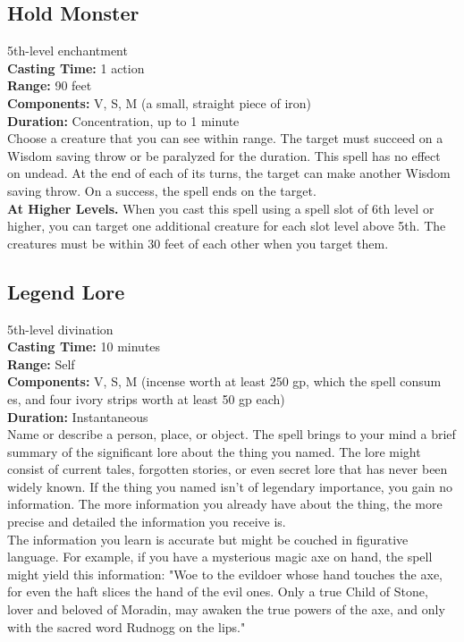 \documentclass[11pt, A4paper, english]{article}
\begin{document}
		\subsection{Hold Monster}
5th-level enchantment \\
\textbf{Casting Time:} 1 action \\
\textbf{Range:} 90 feet \\
\textbf{Components:} V, S, M (a small, straight piece of iron) \\
\textbf{Duration:} Concentration, up to 1 minute \\
Choose a creature that you can see within range. The target must succeed on a Wisdom saving throw or be paralyzed for the duration. This spell has no effect on undead. At the end of each of its turns, the target can make another Wisdom  saving throw. On a success, the spell ends on the target. \\
\textbf{At Higher Levels.} When you cast this spell using a spell slot of 6th level or higher, you can target one additional creature for each slot level above 5th. The creatures must be within 30 feet of each other when you target them.

		\subsection{Legend Lore}
5th-level divination \\
\textbf{Casting Time:} 10 minutes \\
\textbf{Range:} Self \\
\textbf{Components:} V, S, M (incense worth at least 250 gp, which the spell consum es, and four ivory strips worth at least 50 gp each) \\
\textbf{Duration:} Instantaneous \\
Name or describe a person, place, or object. The spell brings to your mind a brief summary of the significant lore about the thing you named. The lore might consist of current tales, forgotten stories, or even secret lore that has never been widely known. If the thing you named isn’t of legendary importance, you gain no information. The more information you already have about the thing, the more precise and detailed the information you receive is. \\
The information you learn is accurate but might be couched in figurative language. For example, if you have a mysterious magic axe on hand, the spell might yield this information: "Woe to the evildoer whose hand touches the axe, for even the haft slices the hand of the evil ones. Only a true Child of Stone, lover and beloved of Moradin, may awaken the true powers of the axe, and only with the sacred word Rudnogg on the lips."
\end{document}
